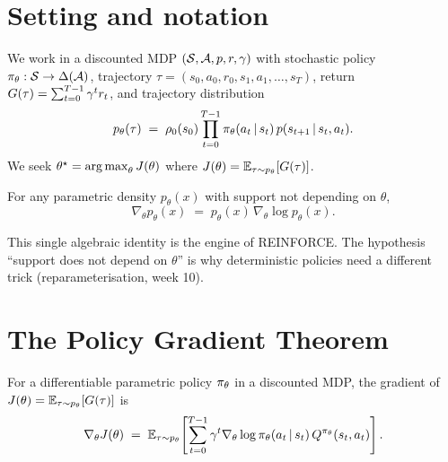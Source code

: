 \documentclass[11pt,oneside]{scrbook}
\begin{document}
\section{Setting and notation}
We work in a discounted MDP $(\mathcal{S}, \mathcal{A}, p, r, \gamma)$ with stochastic policy $\pi_\theta: \mathcal{S} \to \Delta(\mathcal{A})$, trajectory $\tau = (s_0, a_0, r_0, s_1, a_1, \ldots, s_T)$, return $G(\tau) = \sum_{t=0}^{T-1} \gamma^t r_t$, and trajectory distribution
\[
  p_\theta(\tau) \;=\; \rho_0(s_0) \prod_{t=0}^{T-1} \pi_\theta(a_t \,\vert\, s_t)\, p(s_{t+1} \,\vert\, s_t, a_t).
\]
We seek $\theta^\star = \operatorname*{arg\,max}_\theta J(\theta)$ where $J(\theta) = \mathbb{E}_{\tau \sim p_\theta}[G(\tau)]$.

\begin{definition}
\label{def:logderiv}
For any parametric density $p_\theta(x)$ with support not depending on $\theta$,
\[
  \nabla_\theta p_\theta(x) \;=\; p_\theta(x)\, \nabla_\theta \log p_\theta(x).
\]
\end{definition}

This single algebraic identity is the engine of REINFORCE. The hypothesis ``support does not depend on $\theta$'' is why deterministic policies need a different trick (reparameterisation, week 10).

\section{The Policy Gradient Theorem}

\begin{theorem}
\label{thm:pg}
For a differentiable parametric policy $\pi_\theta$ in a discounted MDP, the gradient of $J(\theta) = \mathbb{E}_{\tau \sim p_\theta}[G(\tau)]$ is
\[
  \nabla_\theta J(\theta) \;=\; \mathbb{E}_{\tau \sim p_\theta}\!\left[\sum_{t=0}^{T-1} \gamma^t \nabla_\theta \log \pi_\theta(a_t \,\vert\, s_t)\, Q^{\pi_\theta}(s_t, a_t)\right].
\]
\end{theorem}
\end{document}
